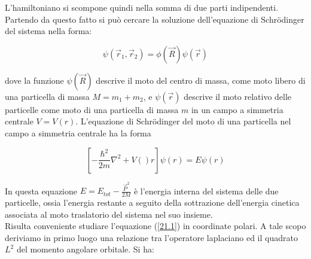 L'hamiltoniano si scompone quindi nella somma di due parti indipendenti. Partendo 
da questo fatto si può cercare la soluzione dell'equazione di Schr\"{o}dinger del sistema nella forma:

\begin{equation}
\psi\left(\vec{r}_1,\vec{r}_2\right)=\phi(\vec{R})\psi(\vec{r})
\end{equation}

dove la funzione $\psi (\vec{R} )$ descrive il moto del centro di massa, come moto libero di una particella di massa $M=m_1+m_2$, e $\psi\left(\vec{r}\right)$ descrive il moto relativo delle particelle come moto di una particella di massa $m$ in un campo a simmetria centrale $V=V\left(r\right)$.
L'equazione di Schr\"{o}dinger del moto di una particella nel campo a simmetria centrale ha la forma

\begin{equation}
\left[-\frac{\hbar^2}{2m}\nabla^2+V\left(\right)r\right]\psi\left(r\right)=E\psi\left(r\right)
\label{21.1}
\end{equation} 

In questa equazione $E=E_{tot}-\frac{\vec{P}^2}{2M}$ è l'energia interna del sistema delle due particelle, ossia l'energia restante a seguito della sottrazione dell'energia cinetica associata al moto traslatorio del sistema nel suo insieme.\\
Risulta conveniente studiare l'equazione
(\ref{21.1}) in coordinate polari. A tale scopo deriviamo in primo luogo una relazione tra l'operatore laplaciano ed il quadrato $L^2$ del momento angolare orbitale. Si ha:

